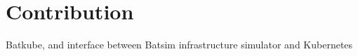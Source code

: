 \documentclass[12pt, a4paper]{memoir}
\begin{document}
\section{Contribution}
Batkube, and interface between Batsim infrastructure simulator and Kubernetes
%
%
%
%
%
%
\end{document}
